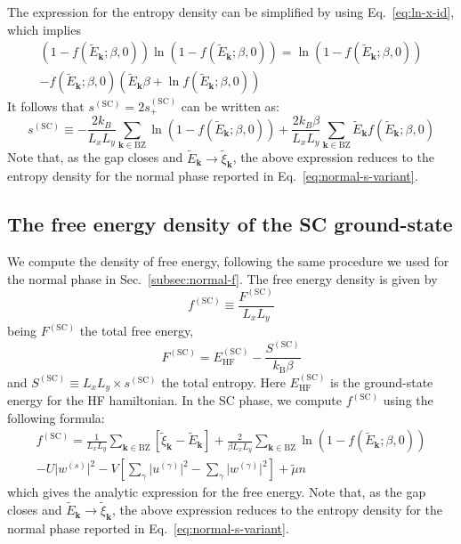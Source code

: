 The expression for the entropy density can be simplified by using Eq.~\eqref{eq:ln-x-id}, which implies
\begin{multline*}
	\left(
		1-f( \tilde{E}_\mathbf{k}; \beta,0)
	\right) \ln \left(
		1-f( \tilde{E}_\mathbf{k}; \beta,0)
	\right) = \ln \left(
	1-f( \tilde{E}_\mathbf{k}; \beta,0)
	\right) \\ 
	-f( \tilde{E}_\mathbf{k}; \beta,0)
	\left(
		\tilde{E}_\mathbf{k}\beta + \ln  f( \tilde{E}_\mathbf{k}; \beta,0)
	\right)
\end{multline*}
It follows that $s^{(\mathrm{SC})}=2s_+^{(\mathrm{SC})}$ can be written as:
\begin{equation}\label{eq:sc-s-variant}
	s^{(\mathrm{SC})} \equiv -\frac{2 k_B}{L_x L_y} \sum_{\mathbf{k}\in\mathrm{BZ}} \ln \left(
		1- f( \tilde{E}_\mathbf{k}; \beta,0)
	\right) 
	+ \frac{2 k_B \beta}{L_x L_y} \sum_{\mathbf{k}\in\mathrm{BZ}} \tilde{E}_\mathbf{k} f( \tilde{E}_\mathbf{k}; \beta,0)
\end{equation}
Note that, as the gap closes and $\tilde{E}_\mathbf{k} \to \tilde{\xi}_\mathbf{k}$, the above expression reduces to the entropy density for the normal phase reported in Eq.~\eqref{eq:normal-s-variant}.

\subsection{The free energy density of the SC ground-state}\label{subsec:sc-f}

We compute the density of free energy, following the same procedure we used for the normal phase in Sec.~\ref{subsec:normal-f}. The free energy density is given by
\begin{equation}\label{eq:sc-fMFT-def}
	f^{(\mathrm{SC})} \equiv \frac{F^{(\mathrm{SC})}}{L_x L_y}
\end{equation}
being $F^{(\mathrm{SC})}$ the total free energy,
\begin{equation}\label{eq:sc-FMFT-def}
	F^{(\mathrm{SC})} = E_\mathrm{HF}^{(\mathrm{SC})} - \frac{S^{(\mathrm{SC})}}{k_\mathrm{B} \beta}
\end{equation}
and $S^{(\mathrm{SC})} \equiv  L_x L_y \times s^{(\mathrm{SC})}$ the total entropy. Here $E_\mathrm{HF}^{(\mathrm{SC})}$ is the ground-state energy for the HF hamiltonian. In the SC phase, we compute $f^{(\mathrm{SC})}$ using the following formula:
\begin{multline}
	f^{(\mathrm{SC})} = \frac{1}{L_x L_y} \sum_{\mathbf{k} \in \mathrm{BZ}} \left[
	\tilde{\xi}_\mathbf{k} - \tilde{E}_\mathbf{k}
	\right] + \frac{2}{\beta L_x L_y} \sum_{\mathbf{k}\in\mathrm{BZ}} \ln \left(
	1- f( \tilde{E}_\mathbf{k}; \beta,0) 
	\right) \\
	-U \big|
	w^{(s)}
	\big|^2 - V \left[
	\sum_\gamma \big|
	u^{(\gamma)}
	\big|^2 - \sum_\gamma \big|
	w^{(\gamma)}
	\big|^2
	\right] + \tilde{\mu} n
	\label{eq:sc-fMFT}
\end{multline}
which gives the analytic expression for the free energy. Note that, as the gap closes and $\tilde{E}_\mathbf{k} \to \tilde{\xi}_\mathbf{k}$, the above expression reduces to the entropy density for the normal phase reported in Eq.~\eqref{eq:normal-s-variant}.

